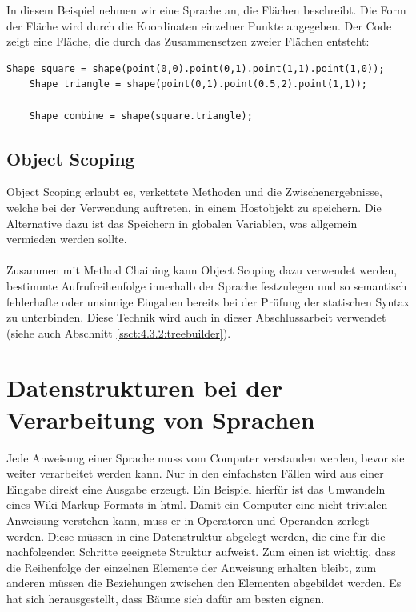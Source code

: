 In diesem Beispiel nehmen wir eine Sprache an, die Flächen beschreibt. Die Form der Fläche wird durch die Koordinaten einzelner Punkte angegeben. Der Code zeigt eine Fläche, die durch das Zusammensetzen zweier Flächen entsteht:

\begin{lstlisting}[caption=beispielhafte Verwendung von Method Nesting]
	Shape square = shape(point(0,0).point(0,1).point(1,1).point(1,0));
	Shape triangle = shape(point(0,1).point(0.5,2).point(1,1));
	
	Shape combine = shape(square.triangle);
\end{lstlisting}

\subsection{Object Scoping}\label{ssct:4.1.3:scoping}
Object Scoping erlaubt es, verkettete Methoden und die Zwischenergebnisse, welche bei der Verwendung auftreten, in einem Hostobjekt zu speichern. Die Alternative dazu ist das Speichern in globalen Variablen, was allgemein vermieden werden sollte\cite{book:fowlerDSL}.
\\ \\
Zusammen mit Method Chaining kann Object Scoping dazu verwendet werden, bestimmte Aufrufreihenfolge innerhalb der Sprache festzulegen und so semantisch fehlerhafte oder unsinnige Eingaben bereits bei der Prüfung der statischen Syntax zu unterbinden. Diese Technik wird auch in dieser Abschlussarbeit verwendet (siehe auch Abschnitt \ref{ssct:4.3.2:treebuilder}).

\section{Datenstrukturen bei der Verarbeitung von Sprachen}\label{sct:4.2:datenstrukturen}
Jede Anweisung einer Sprache muss vom Computer \glqq verstanden \grqq werden, bevor sie weiter verarbeitet werden kann. Nur in den einfachsten Fällen wird aus einer Eingabe direkt eine Ausgabe erzeugt. Ein Beispiel hierfür ist das Umwandeln eines Wiki-Markup-Formats in html\cite{book:parrLang}.
Damit ein Computer eine nicht-trivialen Anweisung verstehen kann, muss er in Operatoren und Operanden zerlegt werden. Diese müssen in eine Datenstruktur abgelegt werden, die eine für die nachfolgenden Schritte geeignete Struktur aufweist. Zum einen ist wichtig, dass die Reihenfolge der einzelnen Elemente der Anweisung erhalten bleibt, zum anderen müssen die Beziehungen zwischen den Elementen abgebildet werden. Es hat sich herausgestellt, dass Bäume sich dafür am besten eignen\cite{book:parrLang}.


